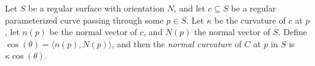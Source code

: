 \begin{defn}
    Let $S$ be a regular surface with orientation $N$, and let $c \subseteq S$ be a regular parameterized curve passing through some $p \in S$. Let $\kappa$ be the curvature of $c$ at $p$, let $n(p)$ be the normal vector of $c$, and $N(p)$ the normal vector of $S$. Define $\cos(\theta) = \langle n(p), N(p) \rangle$, and then the \emph{normal curvature} of $C$ at $p$ in $S$ is $\kappa\cos(\theta)$.
\end{defn}
